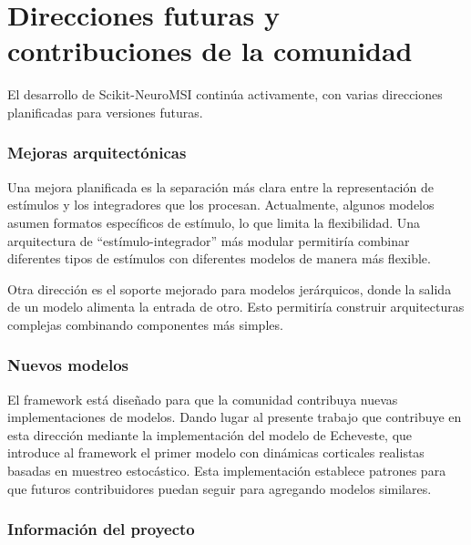 
\section{Direcciones futuras y contribuciones de la comunidad}
\label{sec:snmsi_futuro}

El desarrollo de Scikit-NeuroMSI continúa activamente, con varias direcciones planificadas para versiones futuras.

\subsubsection{Mejoras arquitectónicas}
\label{subsec:snmsi_mejoras}

Una mejora planificada es la separación más clara entre la representación de estímulos y los integradores que los procesan. Actualmente, algunos modelos asumen formatos específicos de estímulo, lo que limita la flexibilidad. Una arquitectura de ``estímulo-integrador'' más modular permitiría combinar diferentes tipos de estímulos con diferentes modelos de manera más flexible.

Otra dirección es el soporte mejorado para modelos jerárquicos, donde la salida de un modelo alimenta la entrada de otro. Esto permitiría construir arquitecturas complejas combinando componentes más simples.

\subsubsection{Nuevos modelos}
\label{subsec:snmsi_nuevos_modelos}

El framework está diseñado para que la comunidad contribuya nuevas implementaciones de modelos. Dando lugar al presente trabajo que contribuye en esta dirección mediante la implementación del modelo de Echeveste, que introduce al framework el primer modelo con dinámicas corticales realistas basadas en muestreo estocástico. Esta implementación establece patrones para que futuros contribuidores puedan seguir para agregando modelos similares.

\subsubsection{Información del proyecto}
\label{subsec:snmsi_info}

